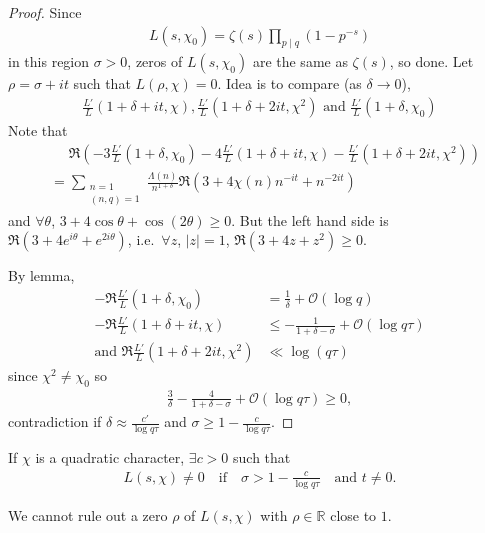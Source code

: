 \documentclass{article}
\newcommand{\1}{\mathbbm{1}}
\newcommand{\bigO}{\mathcal{O}}
\begin{document}
\begin{proof}
  Since
  \begin{align*}
    L(s,\chi_0) = \zeta(s) \prod_{p \mid q} (1 - p^{-s})
  \end{align*}
  in this region $\sigma > 0$, zeros of $L(s,\chi_0)$ are the same as $\zeta(s)$, so done.
  Let $\rho = \sigma + it$ such that $L(\rho,\chi) = 0$. Idea is to compare (as $\delta \to 0$),
  \begin{align*}
    \frac{L'}{L}(1+\delta+it, \chi), \frac{L'}{L}(1+\delta+2it, \chi^2) \text{ and } \frac{L'}{L}(1+\delta,\chi_0)
  \end{align*}
  Note that
  \begin{align*}
    &\phantom{=}\Re(-3\frac{L'}{L}(1+\delta, \chi_0) - 4 \frac{L'}{L}(1+\delta+it,\chi) - \frac{L'}{L}(1+\delta+2it,\chi^2)) \\
    &= \sum_{ \substack{n=1\\(n,q)=1}} \frac{\Lambda(n)}{n^{1+\delta}} \Re(3 + 4 \chi(n) n^{-it} + n^{-2it})
  \end{align*}
  and $\forall \theta$, $3 + 4 \cos \theta + \cos(2 \theta) \geq 0$. But the left hand side is $\Re(3 + 4 e^{i\theta} + e^{2 i \theta})$, i.e.\ $\forall z$, $|z| =1$, $\Re(3 +4z+z^2) \geq 0$.

  By lemma,
  \begin{align*}
    -\Re \frac{L'}{L}(1+\delta,\chi_0) &= \frac{1}{\delta} + \bigO(\log q) \\
  -\Re \frac{L'}{L}(1+\delta+it,\chi) &\leq -\frac{1}{1+\delta-\sigma} + \bigO(\log q \tau) \\
  \text{and } \Re \frac{L'}{L} (1 + \delta + 2it, \chi^2) &\ll \log(q \tau)
  \end{align*}
  since $\chi^2 \neq \chi_0$ so
  \begin{align*}
    \frac{3}{\delta} - \frac{4}{1+\delta-\sigma} + \bigO(\log q \tau) \geq 0,
  \end{align*}
  contradiction if $\delta \approx \frac{c'}{\log q \tau}$ and $\sigma \geq 1 - \frac{c}{\log q \tau}$.
\end{proof}
\begin{nthm}\label{thm:1}
  If $\chi$ is a quadratic character, $\exists c > 0$ such that
  \begin{align*}
    L(s,\chi) \neq 0\quad\text{if}\quad \sigma > 1 - \frac{c}{\log q \tau} \quad\text{and } t \neq 0.
  \end{align*}
\end{nthm}
We cannot rule out a zero $\rho$ of $L(s,\chi)$ with $\rho \in \mathbb{R}$ close to $1$.
\end{document}
